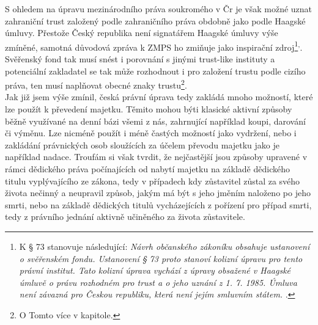 \documentclass{article}
\begin{document}
S ohledem na úpravu mezinárodního práva soukromého v Čr je však možné uznat zahraniční trust založený podle zahraničního práva obdobně jako podle Haagské úmluvy. Přestože Český republika není signatářem Haagské úmluvy výše zmíněné, samotná důvodová zpráva k ZMPS ho zmiňuje jako inspirační zdroj\footnote{K § 73 stanovuje následující: \textit{Návrh občanského zákoníku obsahuje ustanovení o svěřenském fondu. Ustanovení § 73 proto stanoví kolizní úpravu pro tento právní institut. Tato kolizní úprava vychází z úpravy obsažené v Haagské úmluvě o právu rozhodném pro trust a o jeho uznání z 1. 7. 1985. Úmluva není závazná pro Českou republiku, která není jejím smluvním státem. }.}\textsuperscript{,}. Svěřenský fond tak musí snést i porovnání s jinými trust-like instituty a potenciální zakladatel se tak může rozhodnout i pro založení trustu podle cizího práva, ten musí naplňovat obecné znaky trustu\footnote{O Tomto více v kapitole.}.\\




Jak již jsem výše zmínil, česká právní úprava tedy zakládá mnoho možností, které lze použít k převedení majetku. Těmito mohou býti klasické aktivní způsoby běžně využívané na denní bázi všemi z nás, zahrnující například koupi, darování či výměnu. Lze nicméně použít i méně častých možností jako vydržení, nebo i zakládání právnických osob sloužících za účelem převodu majetku jako je například nadace. Troufám si však tvrdit, že nejčastější jsou způsoby upravené v rámci dědického práva počínajících od nabytí majetku na základě dědického titulu vyplývajícího ze zákona, tedy v případech kdy zůstavitel zůstal za svého života nečinný a neupravil způsob, jakým má být s jeho jměním naloženo po jeho smrti, nebo na základě dědických titulů vycházejících z pořízení pro případ smrti, tedy z právního jednání aktivně učiněného za života zůstavitele. \\
\end{document}

